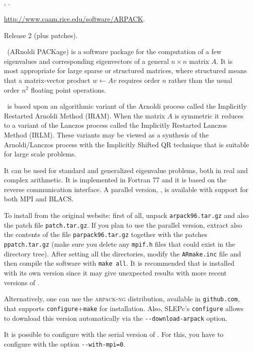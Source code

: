 \subsection*{\underline{\arpack}}
	\begin{description}
	\setlength{\itemsep}{0pt}
	\item[References.]\citep{Lehoucq:1998:AUG}, \citep{Maschhoff:1996:PEP}.
	\item[Website.] \url{http://www.caam.rice.edu/software/ARPACK}.
	\item[Version.] Release 2 (plus patches).
	\item[Summary.] \arpack\ (ARnoldi PACKage) is a software package for the computation of a few eigenvalues and corresponding eigenvectors of a general $n\times n$ matrix $A$. It is most appropriate for large sparse or structured matrices, where structured means that a matrix-vector product $w \leftarrow Av$ requires order $n$ rather than the usual order $n^2$ floating point operations.
	
	\arpack\ is based upon an algorithmic variant of the Arnoldi process called the Implicitly Restarted Arnoldi Method (IRAM). When the matrix $A$ is symmetric it reduces to a variant of the Lanczos process called the Implicitly Restarted Lanczos Method (IRLM). These variants may be viewed as a synthesis of the Arnoldi/Lanczos process with the Implicitly Shifted QR technique that is suitable for large scale problems.

	It can be used for standard and generalized eigenvalue problems, both in real and complex arithmetic. It is implemented in Fortran 77 and it is based on the reverse communication interface. A parallel version, \parpack, is available with support for both MPI and BLACS.
	\item[Installation.]
	To install from the original website: first of all, unpack \texttt{arpack96.tar.gz} and also the patch file \texttt{patch.tar.gz}. If you plan to use the parallel version, extract also the contents of the file \texttt{parpack96.tar.gz} together with the patches \texttt{ppatch.tar.gz} (make sure you delete any \texttt{mpif.h} files that could exist in the directory tree). After setting all the directories, modify the \texttt{ARmake.inc} file and then compile the software with \texttt{make all}. It is recommended that \arpack is installed with its own \lapack version since it may give unexpected results with more recent versions of \lapack.

	Alternatively, one can use the \textsc{arpack-ng} distribution, available in \texttt{github.com}, that supports \texttt{configure}+\texttt{make} for installation. Also, SLEPc's \texttt{configure} allows to download this version automatically via the \texttt{-{}-download-arpack} option.

	It is possible to configure \slepc with the serial version of \arpack. For this, you have to configure \petsc with the option \texttt{-{}-with-mpi=0}.
	\end{description}

